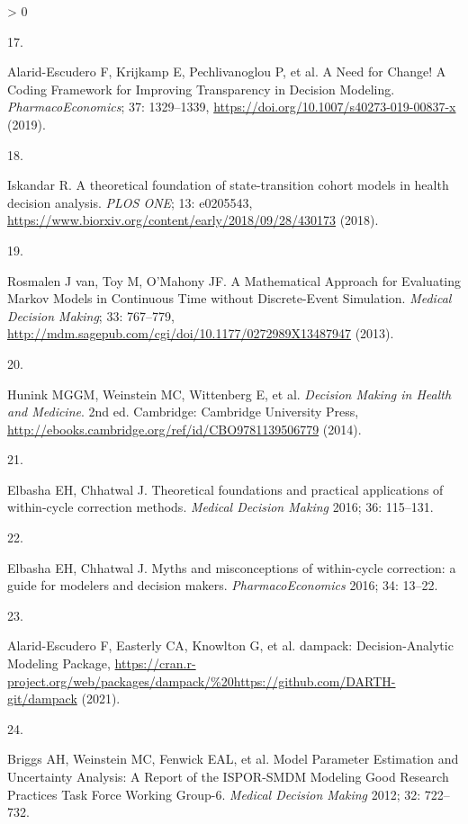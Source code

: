\documentclass[
]{article}
\newlength{\cslhangindent}
\newlength{\csllabelwidth}
\newenvironment{CSLReferences}[2] %
 {%
  \setlength{\parindent}{0pt}
  \ifodd #1 \everypar{\setlength{\hangindent}{\cslhangindent}}\ignorespaces\fi
  \ifnum #2 > 0
  \setlength{\parskip}{#2\baselineskip}
  \fi
 }%
 {}
\newcommand{\CSLLeftMargin}[1]{\parbox[t]{\csllabelwidth}{#1}}
\newcommand{\CSLRightInline}[1]{\parbox[t]{\linewidth - \csllabelwidth}{#1}\break}
\begin{document}
\begin{CSLReferences}{0}{0}
\leavevmode\hypertarget{ref-Alarid-Escudero2019e}{}%
\CSLLeftMargin{17. }
\CSLRightInline{Alarid-Escudero F, Krijkamp E, Pechlivanoglou P, et al. {A Need for Change! A Coding Framework for Improving Transparency in Decision Modeling}. \emph{PharmacoEconomics}; 37: 1329--1339, \url{https://doi.org/10.1007/s40273-019-00837-x} (2019).}

\leavevmode\hypertarget{ref-Iskandar2018a}{}%
\CSLLeftMargin{18. }
\CSLRightInline{Iskandar R. {A theoretical foundation of state-transition cohort models in health decision analysis}. \emph{PLOS ONE}; 13: e0205543, \url{https://www.biorxiv.org/content/early/2018/09/28/430173} (2018).}

\leavevmode\hypertarget{ref-VanRosmalen2013}{}%
\CSLLeftMargin{19. }
\CSLRightInline{Rosmalen J van, Toy M, O'Mahony JF. {A Mathematical Approach for Evaluating Markov Models in Continuous Time without Discrete-Event Simulation}. \emph{Medical Decision Making}; 33: 767--779, \url{http://mdm.sagepub.com/cgi/doi/10.1177/0272989X13487947} (2013).}

\leavevmode\hypertarget{ref-Hunink2014}{}%
\CSLLeftMargin{20. }
\CSLRightInline{Hunink MGGM, Weinstein MC, Wittenberg E, et al. \emph{{Decision Making in Health and Medicine}}. 2nd ed. Cambridge: Cambridge University Press, \url{http://ebooks.cambridge.org/ref/id/CBO9781139506779} (2014).}

\leavevmode\hypertarget{ref-Elbasha2016}{}%
\CSLLeftMargin{21. }
\CSLRightInline{Elbasha EH, Chhatwal J. {Theoretical foundations and practical applications of within-cycle correction methods}. \emph{Medical Decision Making} 2016; 36: 115--131.}

\leavevmode\hypertarget{ref-Elbasha2016a}{}%
\CSLLeftMargin{22. }
\CSLRightInline{Elbasha EH, Chhatwal J. {Myths and misconceptions of within-cycle correction: a guide for modelers and decision makers}. \emph{PharmacoEconomics} 2016; 34: 13--22.}

\leavevmode\hypertarget{ref-Alarid-Escudero2021}{}%
\CSLLeftMargin{23. }
\CSLRightInline{Alarid-Escudero F, Easterly CA, Knowlton G, et al. {dampack: Decision-Analytic Modeling Package}, \url{https://cran.r-project.org/web/packages/dampack/\%20https://github.com/DARTH-git/dampack} (2021).}

\leavevmode\hypertarget{ref-Briggs2012}{}%
\CSLLeftMargin{24. }
\CSLRightInline{Briggs AH, Weinstein MC, Fenwick EAL, et al. {Model Parameter Estimation and Uncertainty Analysis: A Report of the ISPOR-SMDM Modeling Good Research Practices Task Force Working Group-6.} \emph{Medical Decision Making} 2012; 32: 722--732.}


\end{CSLReferences}
\end{document}
